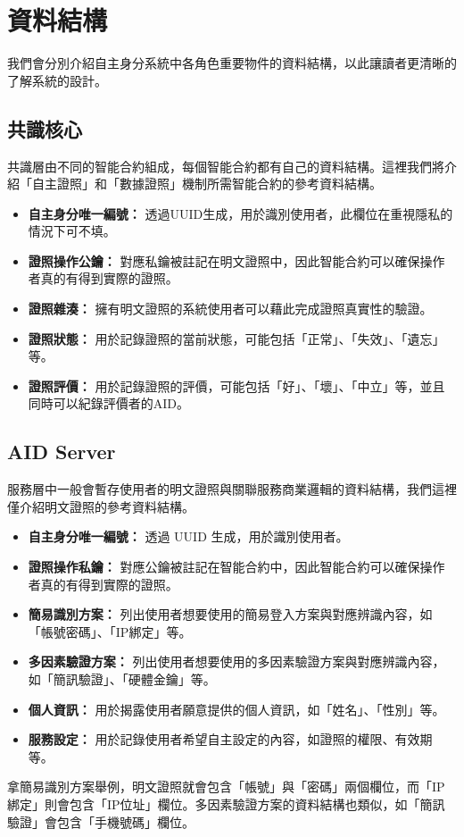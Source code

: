 \section{資料結構}
我們會分別介紹自主身分系統中各角色重要物件的資料結構，以此讓讀者更清晰的了解系統的設計。
\subsection{共識核心}
共識層由不同的智能合約組成，每個智能合約都有自己的資料結構。這裡我們將介紹「自主證照」和「數據證照」機制所需智能合約的參考資料結構。
\begin{itemize}
  \item \textbf{自主身分唯一編號：} 透過UUID生成，用於識別使用者，此欄位在重視隱私的情況下可不填。
  \item \textbf{證照操作公鑰：} 對應私鑰被註記在明文證照中，因此智能合約可以確保操作者真的有得到實際的證照。
  \item \textbf{證照雜湊：} 擁有明文證照的系統使用者可以藉此完成證照真實性的驗證。
  \item \textbf{證照狀態：} 用於記錄證照的當前狀態，可能包括「正常」、「失效」、「遺忘」等。
  \item \textbf{證照評價：} 用於記錄證照的評價，可能包括「好」、「壞」、「中立」等，並且同時可以紀錄評價者的AID。
\end{itemize}
\subsection{AID Server}
服務層中一般會暫存使用者的明文證照與關聯服務商業邏輯的資料結構，我們這裡僅介紹明文證照的參考資料結構。
\begin{itemize}
  \item \textbf{自主身分唯一編號：} 透過 UUID 生成，用於識別使用者。
  \item \textbf{證照操作私鑰：} 對應公鑰被註記在智能合約中，因此智能合約可以確保操作者真的有得到實際的證照。
  \item \textbf{簡易識別方案：} 列出使用者想要使用的簡易登入方案與對應辨識內容，如「帳號密碼」、「IP綁定」等。
  \item \textbf{多因素驗證方案：} 列出使用者想要使用的多因素驗證方案與對應辨識內容，如「簡訊驗證」、「硬體金鑰」等。
  \item \textbf{個人資訊：} 用於揭露使用者願意提供的個人資訊，如「姓名」、「性別」等。
  \item \textbf{服務設定：} 用於記錄使用者希望自主設定的內容，如證照的權限、有效期等。
\end{itemize}
拿簡易識別方案舉例，明文證照就會包含「帳號」與「密碼」兩個欄位，而「IP綁定」則會包含「IP位址」欄位。多因素驗證方案的資料結構也類似，如「簡訊驗證」會包含「手機號碼」欄位。

